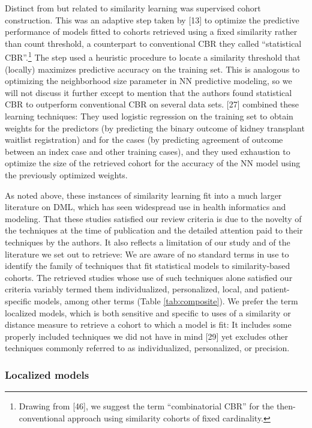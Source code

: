 \documentclass[preprint, 3p,
authoryear]{elsarticle} %
\begin{document}
Distinct from but related to similarity learning was supervised cohort
construction. This was an adaptive step taken by {[}13{]} to optimize
the predictive performance of models fitted to cohorts retrieved using a
fixed similarity rather than count threshold, a counterpart to
conventional CBR they called ``statistical CBR''.\footnote{Drawing from
  {[}46{]}, we suggest the term ``combinatorial CBR'' for the
  then-conventional approach using similarity cohorts of fixed
  cardinality.} The step used a heuristic procedure to locate a
similarity threshold that (locally) maximizes predictive accuracy on the
training set. This is analogous to optimizing the neighborhood size
parameter in NN predictive modeling, so we will not discuss it further
except to mention that the authors found statistical CBR to outperform
conventional CBR on several data sets. {[}27{]} combined these learning
techniques: They used logistic regression on the training set to obtain
weights for the predictors (by predicting the binary outcome of kidney
transplant waitlist registration) and for the cases (by predicting
agreement of outcome between an index case and other training cases),
and they used exhaustion to optimize the size of the retrieved cohort
for the accuracy of the NN model using the previously optimized weights.

As noted above, these instances of similarity learning fit into a much
larger literature on DML, which has seen widespread use in health
informatics and modeling. That these studies satisfied our review
criteria is due to the novelty of the techniques at the time of
publication and the detailed attention paid to their techniques by the
authors. It also reflects a limitation of our study and of the
literature we set out to retrieve: We are aware of no standard terms in
use to identify the family of techniques that fit statistical models to
similarity-based cohorts. The retrieved studies whose use of such
techniques alone satisfied our criteria variably termed them
individualized, personalized, local, and patient-specific models, among
other terms (Table \ref{tab:composite}). We prefer the term localized
models, which is both sensitive and specific to uses of a similarity or
distance measure to retrieve a cohort to which a model is fit: It
includes some properly included techniques we did not have in mind
{[}29{]} yet excludes other techniques commonly referred to as
individualized, personalized, or precision.

\hypertarget{localized-models}{%
\subsubsection{Localized models}\label{localized-models}}
\end{document}
